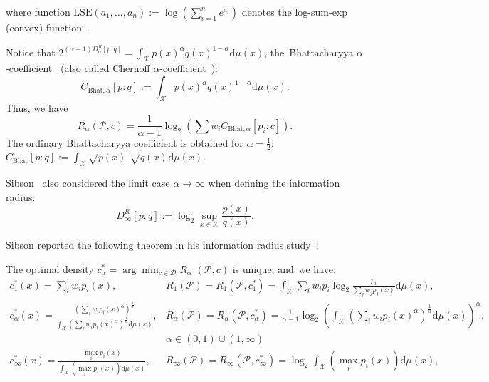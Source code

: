 \documentclass[entropy,article,accept,oneauthor,pdftex,entropy]{Definitions/mdpi}
\def\Bhat{\mathrm{Bhat}}
\def\dmu{\mathrm{d}\mu}
\def\calD{\mathcal{D}}
\def\calP{\mathcal{P}}
\def\calX{\mathcal{X}}
\def\LSE{\mathrm{LSE}}
\def\dmu{\mathrm{d}\mu}
\begin{document}
\begin{paracol}{2}
\switchcolumn

where function $\LSE(a_1,\ldots,a_n):=\log\left(\sum_{i=1}^n e^{a_i}\right)$ denotes the log-sum-exp (convex) function~\cite{ConvexOptim-2004,KLLSE-2016}.


Notice that $2^{(\alpha-1)D_\alpha^R[p:q]}=\int_\calX p(x)^\alpha q(x)^{1-\alpha}\dmu(x)$, the~Bhattacharyya $\alpha$-coefficient~\cite{BR-2011} (also called Chernoff $\alpha$-coefficient~\cite{Chernoff-2011,Chernoff-2013}):
\begin{equation}
C_{\Bhat,\alpha}[p:q]:=\int_\calX p(x)^\alpha q(x)^{1-\alpha}\dmu(x).
\end{equation}
Thus, we have
\begin{equation}
R_\alpha(\calP,c)=\frac{1}{\alpha-1}\log_2 \left(\sum w_i C_{\Bhat,\alpha}[p_i:c]\right).
\end{equation}
The ordinary Bhattacharyya coefficient is obtained for $\alpha=\frac{1}{2}$: $C_{\Bhat}[p:q]:=\int_\calX \sqrt{p(x)}$ $\sqrt{q(x)}\dmu(x)$.

Sibson~\cite{Sibson-1969} also considered the limit case $\alpha\rightarrow\infty$ when defining the information radius:
\begin{equation}
D_\infty^R[p:q]:=\log_2 \sup_{x\in\calX} \frac{p(x)}{q(x)}.
\end{equation}
 


Sibson reported the following theorem in his information radius study~\cite{Sibson-1969}:

\begin{Theorem}\label{thm:Sibson}
The optimal density $c^*_\alpha=\arg\min_{c\in\calD} R_\alpha$ $(\calP,c)$ is unique, and~we have:
\small{$$
\begin{array}{lll}
c^*_1(x)=\sum_i w_ip_i(x), & R_1(\calP)=R_1(\calP,c_1^*)=\int_\calX \sum_i w_ip_i\log_2\frac{p_i}{\sum_j w_jp_j(x)}\dmu(x), &   \\
c^*_\alpha(x)=\frac{(\sum_i w_ip_i(x)^\alpha)^{\frac{1}{\alpha}} }{\int_\calX (\sum_i w_ip_i(x)^\alpha)^{\frac{1}{\alpha}}\dmu(x)}, &
R_\alpha(\calP)=R_\alpha(\calP,c_\alpha^*)=
\frac{1}{\alpha-1}\log_2 \left(\int_\calX (\sum_i w_i p_i(x)^\alpha)^{\frac{1}{\alpha}}\dmu(x)\right)^{\alpha},  
 & \\
 & \alpha\in(0,1)\cup(1,\infty)\\
c_\infty^*(x)= \frac{\max_i p_i(x)}{\int_\calX (\max_i p_i(x))\dmu(x)}, & R_\infty(\calP)=R_\infty(\calP,c_\infty^*)
=\log_2 \int_\calX \left(\max_i p_i(x)\right)\dmu(x),& 
\end{array}
$$}
\end{Theorem}


\end{paracol}
\end{document}
